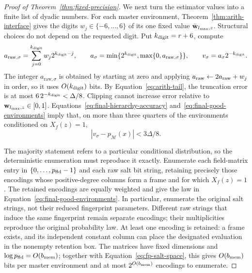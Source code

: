 \documentclass[11pt]{article}
\numberwithin{equation}{section}
\theoremstyle{definition}
\theoremstyle{remark}
\begin{document}
\begin{proof}[Proof of Theorem~\ref{thm:fixed-precision}]
We next turn the estimator values into a finite list of dyadic numbers.
For each master environment, Theorem~\ref{thm:arith-interface}
gives the digits $w_j\in\{-6,\ldots,6\}$ of its one fixed value
$\bar {\mathbf{w}}_{l_{\rm max},z}$. Structural choices do not depend on the requested
digit. Put ${k_{\rm digit}}=r+6$, compute
\[
 {a_{\mathrm{raw},\sigma}}=\sum_{j=0}^{{k_{\rm digit}}}w_j2^{{k_{\rm digit}}-j},\qquad
 a_\sigma=\min\{2^{k_{\rm digit}},\max\{0,{a_{\mathrm{raw},\sigma}}\}\},\qquad
 v_\sigma=a_\sigma2^{-{k_{\rm digit}}}.
\]
The integer ${a_{\mathrm{raw},\sigma}}$ is obtained by starting at zero and applying
${a_{\rm raw}}\leftarrow2{a_{\rm raw}}+w_j$ in order, so it uses $O({k_{\rm digit}})$ bits.
By Equation~\eqref{eq:arith-tail}, the truncation error is at most
$6\,2^{-{k_{\rm digit}}}<\Delta/8$. Clipping cannot increase error relative to
${\mathbf{w}}_{l_{\rm max},z}\in[0,1]$. Equations~\eqref{eq:final-hierarchy-accuracy}
and~\eqref{eq:final-good-environments} imply that, on more than
three quarters of the environments conditioned on $X_f(z)=1$,
\begin{equation}\label{eq:final-dyadic-accuracy}
 |v_\sigma-p_{\mathcal M}(x)|<3\Delta/8.
\end{equation}

The majority statement refers to a particular conditional distribution, so the deterministic enumeration must reproduce it exactly. Enumerate each field-matrix
entry in $\{0,\ldots,{p_{\rm fld}}-1\}$ and each raw salt bit string, retaining
precisely those encodings whose positive-degree columns form a frame
and for which $X_f(z)=1$. The retained encodings are equally weighted
and give the law in Equation~\eqref{eq:final-good-environments}.
In particular, enumerate the original salt strings, not their reduced
fingerprint parameters. Different raw strings that induce the same
fingerprint remain separate encodings; their multiplicities reproduce
the original probability law. At least one encoding is retained: a frame
exists, and its independent constant column can place the designated
evaluation in the nonempty retention box. The matrices have fixed
dimensions and $\log {p_{\rm fld}}=O({b_{\rm mem}})$; together with
Equation~\eqref{eq:fp-salt-space}, this gives $O({b_{\rm mem}})$ bits per master
environment and at most $2^{O({b_{\rm mem}})}$ encodings to enumerate.


\end{proof}
\end{document}
